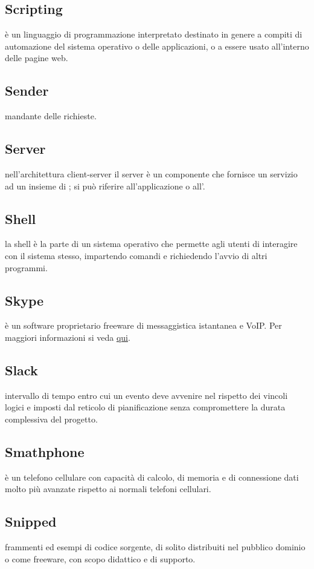 \documentclass[12pt,a4paper]{article}
\begin{document}
\subsection{Scripting} 
è un linguaggio di programmazione interpretato destinato in genere a compiti di automazione del sistema operativo o delle applicazioni, o a essere usato all'interno delle pagine web.

\subsection{Sender} 
mandante delle richieste.

\subsection{Server} 
nell'architettura client-server il server è un componente che fornisce un servizio ad un insieme di ; si può riferire all'applicazione o all'.

\subsection{Shell}
la shell è la parte di un sistema operativo che permette agli utenti di interagire con il sistema stesso, impartendo comandi e richiedendo l'avvio di altri programmi.

\subsection{Skype} 
è un software proprietario freeware di messaggistica istantanea e VoIP. Per maggiori informazioni si veda \href{https://it.wikipedia.org/wiki/Skype}{qui}.

\subsection{Slack} 
intervallo di tempo entro cui un evento deve avvenire nel rispetto dei vincoli logici e imposti dal reticolo di pianificazione senza compromettere la durata complessiva del progetto.

\subsection{Smathphone} 
è un telefono cellulare con capacità di calcolo, di memoria e di connessione dati molto più avanzate rispetto ai normali telefoni cellulari.

\subsection{Snipped} 
frammenti ed esempi di codice sorgente, di solito distribuiti nel pubblico dominio o come freeware, con scopo didattico e di supporto.
\end{document}
